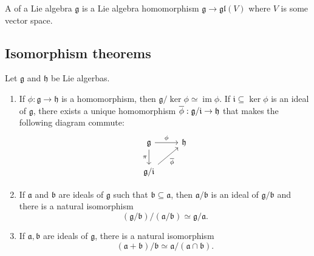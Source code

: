 \documentclass{article}
\DeclareMathOperator{\im}{im}
\newcommand{\frka}{{\ensuremath{\mathfrak{a}}}}
\newcommand{\frkb}{{\ensuremath{\mathfrak{b}}}}
\newcommand{\frkg}{{\ensuremath{\mathfrak{g}}}}
\newcommand{\frkh}{{\ensuremath{\mathfrak{h}}}}
\newcommand{\frki}{{\ensuremath{\mathfrak{i}}}}
\newcommand{\glalg}{\ensuremath{\mathfrak{gl}}}
\begin{document}
\begin{definition}
    A  of a Lie algebra $\frkg$ is a Lie algebra homomorphism $\frkg \to \glalg(V)$ where $V$ is some vector space.
\end{definition}

\subsection{Isomorphism theorems}

\begin{theorem}
    Let $\frkg$ and $\frkh$ be Lie algerbas.
    \begin{enumerate}[label=(\alph*)]
        \item \label{thm:FirstIsomorphismThm}
            If $\phi: \frkg \to \frkh$ is a homomorphism, then $\frkg / \ker \phi \simeq \im \phi$.
            If $\frki \subseteq \ker \phi$ is an ideal of $\frkg$, there exists a unique homomorphism $\barphi: \frkg/\frki \to \frkh$ that makes the following diagram commute:
            \[
                \begin{tikzcd}
                    \frkg \arrow[r, "\phi"] \arrow[d, "\pi"'] & \frkh \\ 
                                                             \frkg/\frki \arrow[ur, "\barphi"']
                \end{tikzcd}
            \]
        \item 
            If $\frka$ and $\frkb$ are ideals of $\frkg$ such that $\frkb \subseteq \frka$, then $\frka/\frkb$ is an ideal of $\frkg/\frkb$ and there is a natural isomorphism
            \[
                (\frkg/\frkb)/(\frka/\frkb)
                \simeq
                \frkg/\frka.
            \]
        \item 
            If $\frka, \frkb$ are ideals of $\frkg$, there is a natural isomorphism
            \[
                (\frka + \frkb)/\frkb
                \simeq
                \frka/(\frka \cap \frkb).
            \]
    \end{enumerate}
\end{theorem}
\end{document}
